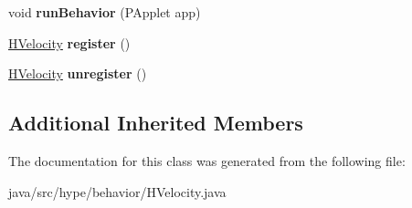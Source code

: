\begin{DoxyCompactItemize}
\item 
\hypertarget{classhype_1_1behavior_1_1_h_velocity_acc6d4560989de30788ec2ae4f1ea6913}{void {\bfseries run\-Behavior} (P\-Applet app)}\label{classhype_1_1behavior_1_1_h_velocity_acc6d4560989de30788ec2ae4f1ea6913}

\item 
\hypertarget{classhype_1_1behavior_1_1_h_velocity_acefec10ae890e65be256238ed0e2800f}{\hyperlink{classhype_1_1behavior_1_1_h_velocity}{H\-Velocity} {\bfseries register} ()}\label{classhype_1_1behavior_1_1_h_velocity_acefec10ae890e65be256238ed0e2800f}

\item 
\hypertarget{classhype_1_1behavior_1_1_h_velocity_a5673f18c65637da5063bb7b9b66c7905}{\hyperlink{classhype_1_1behavior_1_1_h_velocity}{H\-Velocity} {\bfseries unregister} ()}\label{classhype_1_1behavior_1_1_h_velocity_a5673f18c65637da5063bb7b9b66c7905}

\end{DoxyCompactItemize}
\subsection*{Additional Inherited Members}


The documentation for this class was generated from the following file\-:\begin{DoxyCompactItemize}
\item 
java/src/hype/behavior/H\-Velocity.\-java\end{DoxyCompactItemize}

